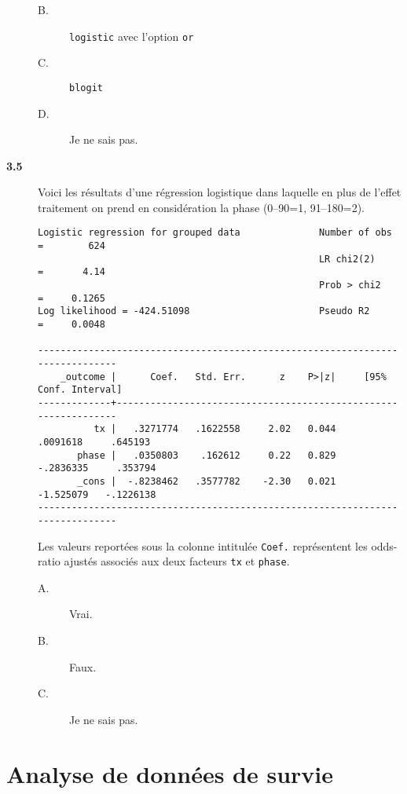 \begin{description}
\begin{description}
\item[B.] \verb|logistic| avec l'option \texttt{or}
\item[C.] \verb|blogit|
\item[D.] Je ne sais pas.
\end{description}
\item[\bf 3.5] Voici les résultats d'une régression logistique dans laquelle
  en plus de l'effet traitement on prend en considération la phase (0–90=1,
  91–180=2). 
\begin{verbatim}
Logistic regression for grouped data              Number of obs   =        624
                                                  LR chi2(2)      =       4.14
                                                  Prob > chi2     =     0.1265
Log likelihood = -424.51098                       Pseudo R2       =     0.0048

------------------------------------------------------------------------------
    _outcome |      Coef.   Std. Err.      z    P>|z|     [95% Conf. Interval]
-------------+----------------------------------------------------------------
          tx |   .3271774   .1622558     2.02   0.044     .0091618     .645193
       phase |   .0350803    .162612     0.22   0.829    -.2836335     .353794
       _cons |  -.8238462   .3577782    -2.30   0.021    -1.525079   -.1226138
------------------------------------------------------------------------------
\end{verbatim}
Les valeurs reportées sous la colonne intitulée \texttt{Coef.} représentent
les odds-ratio ajustés associés aux deux facteurs \texttt{tx} et \texttt{phase}.
\begin{description}
\item[A.] Vrai.
\item[B.] Faux.
\item[C.] Je ne sais pas.
\end{description}
\end{description}


\chapter{Analyse de données de survie}

